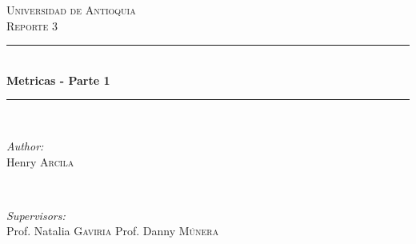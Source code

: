 \documentclass[12pt]{article}
\begin{document}
\begin{titlepage}

\newcommand{\HRule}{\rule{\linewidth}{0.5mm}} %

\center %
 

\textsc{\LARGE Universidad de Antioquia}\\[1.5cm] %
\textsc{\Large Reporte 3}\\[0.5cm] %


\HRule \\[0.4cm]
{ \huge \bfseries Metricas - Parte 1}\\[0.4cm] %
\HRule \\[1.5cm]
 

\begin{minipage}{0.4\textwidth}
\begin{flushleft} \large
\emph{Author:}\\
Henry \textsc{Arcila} %
\end{flushleft}
\end{minipage}
~
\begin{minipage}{0.4\textwidth}
\begin{flushright} \large
\emph{Supervisors:} \\
Prof. Natalia \textsc{Gaviria} %
Prof. Danny \textsc{Múnera} %

\end{flushright}
\end{minipage}\\[2cm]


\end{titlepage}
\end{document}
